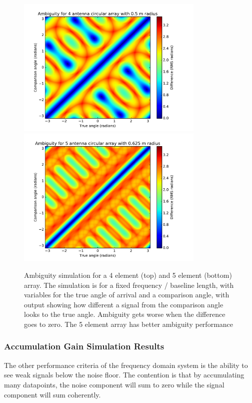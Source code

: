 \begin{figure}
  \centering
  \includegraphics[width=0.8\textwidth]{4element-fixedbaseline}
  \includegraphics[width=0.8\textwidth]{5element-fixedbaseline}
  \caption{Ambiguity simulation for a 4 element (top) and 5 element (bottom) array. The simulation is for a fixed frequency / baseline length, with variables for the true angle of arrival and a comparison angle, with output showing how different a signal from the comparison angle looks to the true angle. Ambiguity gets worse when the difference goes to zero. The 5 element array has better ambiguity performance}
  \label{fig:system-design:4-vs-5-element-fixed-baseline}
\end{figure}


\subsubsection{Accumulation Gain Simulation Results}

The other performance criteria of the frequency domain system is the ability to see weak signals below the noise floor. The contention is that by accumulating many datapoints, the noise component will sum to zero while the signal component will sum coherently.

